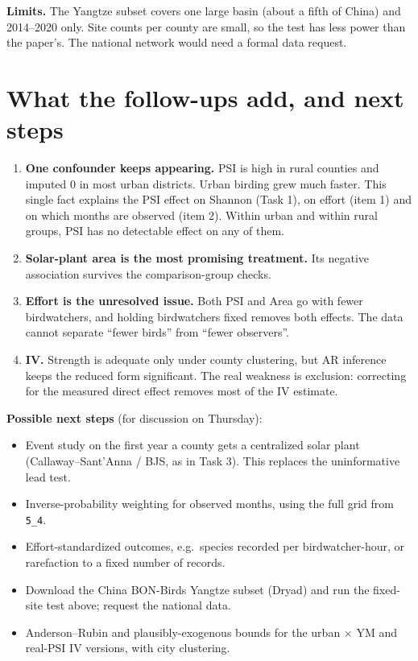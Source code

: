 \documentclass[11pt]{article}
\begin{document}
\textbf{Limits.} The Yangtze subset covers one large basin (about a fifth of China) and 2014--2020 only. Site counts per county are small, so the test has less power than the paper's. The national network would need a formal data request.

\section{What the follow-ups add, and next steps}
\begin{enumerate}[leftmargin=18pt,itemsep=3pt]
\item \textbf{One confounder keeps appearing.} PSI is high in rural counties and imputed 0 in most urban districts. Urban birding grew much faster. This single fact explains the PSI effect on Shannon (Task 1), on effort (item 1) and on which months are observed (item 2). Within urban and within rural groups, PSI has no detectable effect on any of them.
\item \textbf{Solar-plant area is the most promising treatment.} Its negative association survives the comparison-group checks.
\item \textbf{Effort is the unresolved issue.} Both PSI and Area go with fewer birdwatchers, and holding birdwatchers fixed removes both effects. The data cannot separate ``fewer birds'' from ``fewer observers''.
\item \textbf{IV.} Strength is adequate only under county clustering, but AR inference keeps the reduced form significant. The real weakness is exclusion: correcting for the measured direct effect removes most of the IV estimate.
\end{enumerate}

\textbf{Possible next steps} (for discussion on Thursday):
\begin{itemize}[leftmargin=14pt,itemsep=1pt]
\item Event study on the first year a county gets a centralized solar plant (Callaway--Sant'Anna / BJS, as in Task 3). This replaces the uninformative lead test.
\item Inverse-probability weighting for observed months, using the full grid from \texttt{5\_4}.
\item Effort-standardized outcomes, e.g.\ species recorded per birdwatcher-hour, or rarefaction to a fixed number of records.
\item Download the China BON-Birds Yangtze subset (Dryad) and run the fixed-site test above; request the national data.
\item Anderson--Rubin and plausibly-exogenous bounds for the urban $\times$ YM and real-PSI IV versions, with city clustering.
\end{itemize}
\end{document}
